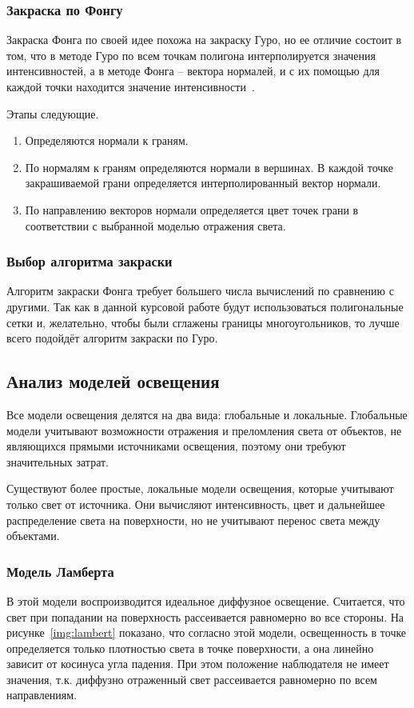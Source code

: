\subsubsection{Закраска по Фонгу}

Закраска Фонга по своей идее похожа на закраску Гуро, но ее отличие состоит в том, что в методе Гуро по всем точкам полигона интерполируется значения интенсивностей, а в методе Фонга – вектора нормалей, и с их помощью для каждой точки находится значение интенсивности~\cite{roders}.

Этапы следующие.
\begin{enumerate}
	\item Определяются нормали к граням.
	\item По нормалям к граням определяются нормали в вершинах. В каждой точке закрашиваемой грани определяется интерполированный вектор нормали.
	\item По направлению векторов нормали определяется цвет точек грани в соответствии с выбранной моделью отражения света.
\end{enumerate}

\subsubsection {Выбор алгоритма закраски}

Алгоритм закраски Фонга требует большего числа вычислений по сравнению с другими.
Так как в данной курсовой работе будут использоваться полигональные сетки и, желательно, чтобы были сглажены границы многоугольников, то лучше всего подойдёт алгоритм закраски по Гуро.

\subsection{Анализ моделей освещения}

Все модели освещения делятся на два вида: глобальные и локальные. 
Глобальные модели учитывают возможности отражения и преломления света от объектов, не являющихся прямыми источниками освещения, поэтому они требуют значительных затрат.

Существуют более простые, локальные модели освещения, которые учитывают только свет от источника. 
Они вычисляют интенсивность, цвет и дальнейшее распределение света на поверхности, но не учитывают перенос света между объектами.  

\subsubsection{Модель Ламберта}
В этой модели воспроизводится идеальное диффузное освещение. Считается, что свет при попадании на поверхность рассеивается равномерно во все стороны.
На рисунке~\ref{img:lambert} показано, что согласно этой модели, освещенность в точке определяется только плотностью света в точке поверхности, а она линейно зависит от косинуса угла падения. 
При этом положение наблюдателя не имеет значения, т.к. диффузно отраженный свет рассеивается равномерно по всем направлениям.

